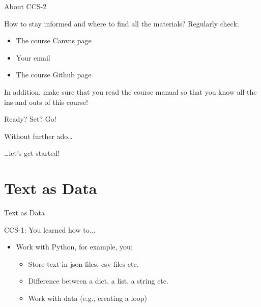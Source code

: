 \documentclass[handout]{beamer}
\begin{document}
\begin{frame}{About CCS-2} 
	
	How to stay informed and where to find all the materials? Regularly check:	
	\begin{itemize}
		\item The course Canvas page
		\item Your email
		\item The course Github page
	\end{itemize}

	In addition, make sure that you read the course manual so that you know all the ins and outs of this course!

\end{frame}



\begin{frame}{Ready? Set? Go!} 
	
	Without further ado\dots
	
	\dots let's get started!
	
\end{frame}



\section{Text as Data}


\begin{frame}{Text as Data}
	
CCS-1: You learned how to...
	\begin{itemize}
	\item Work with Python, for example, you:
	\begin{itemize}
		\item Store text in json-files, csv-files etc.
		\item Difference between a dict, a list, a string etc.
		\item Work with data (e.g., creating a loop)
	\end{itemize}
\end{itemize}
	
\end{frame}
\end{document}
